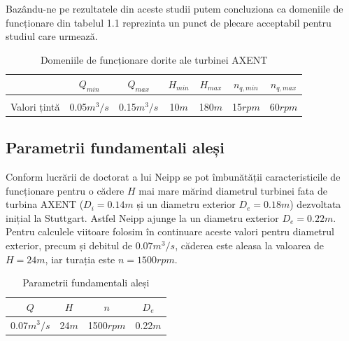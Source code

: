 Bazându-ne pe rezultatele din aceste studii putem concluziona ca domeniile de funcționare din tabelul 1.1 reprezinta un punct de plecare acceptabil pentru studiul care urmează.

\begin{table}[ht]
\caption{Domeniile de funcționare dorite ale turbinei AXENT \cite{neipp2017zweistufige}}%
\centering

\begin{tabular}{ c | c | c | c | c | c | c }
           & $Q_{min}$          & $Q_{max}$          & $H_{min}$    & $H_{max}$     & $n_{q,min}$        & $n_{q,max}$ \\ \hline
&&&&&&\\[-0.5em]
Valori țintă  & 0.05$\si{m^3/s}$ & 0.15$\si{m^3/s}$ & 10$\si{m}$ & 180$\si{m}$ & 15$\si{rpm}$ & 60$\si{rpm}$ \\
\end{tabular}

\end{table}


\subsection{Parametrii fundamentali aleși}

Conform lucrării de doctorat a lui Neipp \cite{neipp2017zweistufige} se pot îmbunătății caracteristicile de funcționare pentru o cădere $H$ mai mare mărind diametrul turbinei fata de turbina AXENT ($D_i = 0.14\si{m}$ și un diametru exterior $D_e = 0.18\si{m}$) dezvoltata inițial la Stuttgart. Astfel Neipp ajunge la un diametru exterior $D_e = 0.22\si{m}$. Pentru calculele viitoare folosim în continuare aceste valori pentru diametrul exterior, precum și debitul de $0.07\si{m^3/s}$, căderea este aleasa la valoarea de $H=24\si{m}$, iar turația este $n=1500\si{rpm}$.

\begin{table}[ht]
\caption{Parametrii fundamentali aleși}%
\centering

\begin{tabular}{ c | c | c | c }
$Q$ & $H$ & $n$ & $D_e$ \\ \hline
0.07$\si{m^3/s}$ & 24$\si{m}$ & 1500$\si{rpm}$ & 0.22$\si{m}$ \\
\end{tabular}

\end{table}

\clearpage